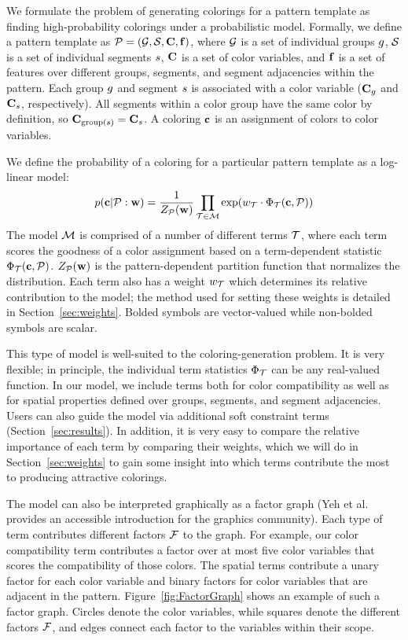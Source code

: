 
We formulate the problem of generating colorings for a pattern template as finding high-probability colorings under a probabilistic model. Formally, we define a pattern template as $\mathcal{P} = (\mathcal{G}, \mathcal{S}, \mathbf{C}, \mathbf{f})$, where $\mathcal{G}$ is a set of individual groups $g$, $\mathcal{S}$ is a set of individual segments $s$, $\mathbf{C}$ is a set of color variables, and $\mathbf{f}$ is a set of features over different groups, segments, and segment adjacencies within the pattern. Each group $g$ and segment $s$ is associated with a color variable ($\mathbf{C}_g$ and $\mathbf{C}_s$, respectively). All segments within a color group have the same color by definition, so $\mathbf{C}_{\text{group}(s)} = \mathbf{C}_s$. A coloring $\mathbf{c}$ is an assignment of colors to color variables.

We define the probability of a coloring for a particular pattern template as a log-linear model:  
\begin{equation*}
 p(\mathbf{c} | \mathcal{P} : \mathbf{w}) = \frac{1}{Z_{\mathcal{P}}(\mathbf{w})} \prod_{\mathcal{T} \in \mathcal{M}} \exp(w_{\mathcal{T}} \cdot \Phi_{\mathcal{T}}(\mathbf{c}, \mathcal{P}))
\end{equation*}
The model $\mathcal{M}$ is comprised of a number of different terms $\mathcal{T}$, where each term scores the goodness of a color assignment based on a term-dependent statistic $\Phi_{\mathcal{T}}(\mathbf{c},\mathcal{P})$. $Z_{\mathcal{P}}(\mathbf{w})$ is the pattern-dependent partition function that normalizes the distribution. Each term also has a weight $w_{\mathcal{T}}$ which determines its relative contribution to the model; the method used for setting these weights is detailed in Section~\ref{sec:weights}. Bolded symbols are vector-valued while non-bolded symbols are scalar.

This type of model is well-suited to the coloring-generation problem. It is very flexible; in principle, the individual term statistics $\Phi_{\mathcal{T}}$ can be any real-valued function. In our model, we include terms both for color compatibility as well as for spatial properties defined over groups, segments, and segment adjacencies. Users can also guide the model via additional soft constraint terms (Section~\ref{sec:results}). In addition, it is very easy to compare the relative importance of each term by comparing their weights, which we will do in Section~\ref{sec:weights} to gain some insight into which terms contribute the most to producing attractive colorings. 

The model can also be interpreted graphically as a factor graph (Yeh et al.~ provides an accessible introduction for the graphics community). Each type of term contributes different factors $\mathcal{F}$ to the graph. For example, our color compatibility term contributes a factor over at most five color variables that scores the compatibility of those colors. The spatial terms contribute a unary factor for each color variable and binary factors for color variables that are adjacent in the pattern. Figure~\ref{fig:FactorGraph} shows an example of such a factor graph. Circles denote the color variables, while squares denote the different factors $\mathcal{F}$, and edges connect each factor to the variables within their scope. 


